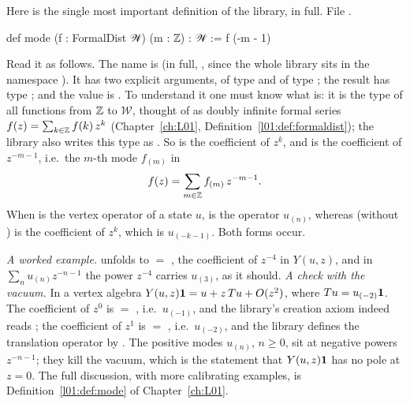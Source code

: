 \begin{example}\label{ch01:ex:mode}
Here is the single most important definition of the library, in full.
\noindent File .
\begin{leancode}
def mode (f : FormalDist 𝒲) (m : ℤ) : 𝒲 := f (-m - 1)
\end{leancode}
Read it as follows. The name is  (in full, , since the whole library sits
in the namespace ). It has two explicit arguments,  of type 
and  of type ; the result has type ; and the value is .
To understand it one must know what  is: it is the type  of all
functions from ${\mathbb{Z}}$ to $\mathcal W$, thought of as doubly infinite formal series
$f(z) = \sum_{k\in{\mathbb{Z}}} f(k)\,z^{k}$ (Chapter~\ref{ch:L01}, Definition~\ref{l01:def:formaldist});
the library also writes this type as . So  is the coefficient of $z^k$, and
 is the coefficient of $z^{-m-1}$, i.e.\ the $m$-th mode $f_{(m)}$ in
\begin{equation*}
  f(z) = \sum_{m\in{\mathbb{Z}}} f_{(m)}\, z^{-m-1}.
\end{equation*}
When  is the vertex operator  of a state $u$,  is the operator
$u_{(n)}$, whereas  (without ) is the coefficient of $z^k$, which is
$u_{(-k-1)}$. Both forms occur.

\emph{A worked example.}  unfolds to  $=$ , the
coefficient of $z^{-4}$ in $Y(u,z)$, and in $\sum_n u_{(n)}z^{-n-1}$ the power $z^{-4}$ carries
$u_{(3)}$, as it should. \emph{A check with the vacuum.} In a vertex algebra
$Y(u,z)\mathbf{1} = u + z\,Tu + O(z^2)$, where $Tu = u_{(-2)}\mathbf{1}$. The coefficient of $z^0$ is
 $=$ , i.e.\ $u_{(-1)}$, and the library's creation axiom indeed
reads ; the coefficient of $z^1$ is  $=$
, i.e.\ $u_{(-2)}$, and the library defines the translation operator by
. The positive modes $u_{(n)}$, $n\ge0$, sit at negative powers
$z^{-n-1}$; they kill the vacuum, which is the statement that $Y(u,z)\mathbf{1}$ has no pole at $z=0$.
The full discussion, with more calibrating examples, is Definition~\ref{l01:def:mode} of
Chapter~\ref{ch:L01}.
\end{example}

